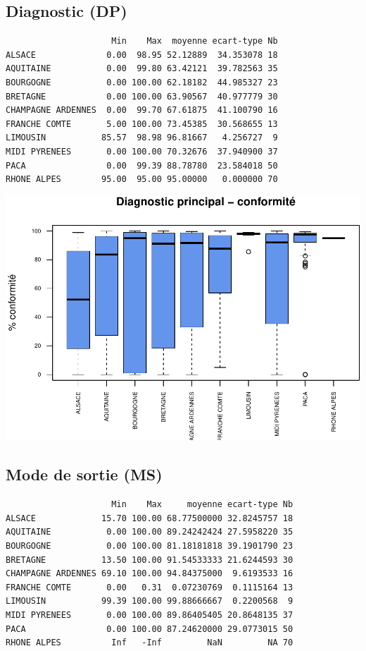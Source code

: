 \documentclass[]{article}
\begin{document}
\subsection{Diagnostic (DP)}\label{diagnostic-dp-1}

\begin{verbatim}
                     Min    Max  moyenne ecart-type Nb
ALSACE              0.00  98.95 52.12889  34.353078 18
AQUITAINE           0.00  99.80 63.42121  39.782563 35
BOURGOGNE           0.00 100.00 62.18182  44.985327 23
BRETAGNE            0.00 100.00 63.90567  40.977779 30
CHAMPAGNE ARDENNES  0.00  99.70 67.61875  41.100790 16
FRANCHE COMTE       5.00 100.00 73.45385  30.568655 13
LIMOUSIN           85.57  98.98 96.81667   4.256727  9
MIDI PYRENEES       0.00 100.00 70.32676  37.940900 37
PACA                0.00  99.39 88.78780  23.584018 50
RHONE ALPES        95.00  95.00 95.00000   0.000000 70
\end{verbatim}

\includegraphics{septembre2015_files/figure-latex/unnamed-chunk-26-1.pdf}

\subsection{Mode de sortie (MS)}\label{mode-de-sortie-ms-1}

\begin{verbatim}
                     Min    Max     moyenne ecart-type Nb
ALSACE             15.70 100.00 68.77500000 32.8245757 18
AQUITAINE           0.00 100.00 89.24242424 27.5958220 35
BOURGOGNE           0.00 100.00 81.18181818 39.1901790 23
BRETAGNE           13.50 100.00 91.54533333 21.6244593 30
CHAMPAGNE ARDENNES 69.10 100.00 94.84375000  9.6193533 16
FRANCHE COMTE       0.00   0.31  0.07230769  0.1115164 13
LIMOUSIN           99.39 100.00 99.88666667  0.2200568  9
MIDI PYRENEES       0.00 100.00 89.86405405 20.8648135 37
PACA                0.00 100.00 87.24620000 29.0773015 50
RHONE ALPES          Inf   -Inf         NaN         NA 70
\end{verbatim}
\end{document}
